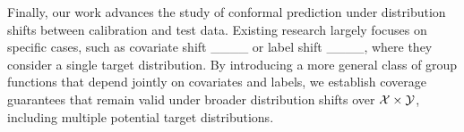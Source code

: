 Finally, our work advances the study of conformal prediction under distribution shifts between calibration and test data. Existing research largely focuses on specific cases, such as covariate shift ____ or label shift ____, where they consider a single target distribution. By introducing a more general class of group functions that depend jointly on covariates and labels, we establish coverage guarantees that remain valid under broader distribution shifts over $\cal X \times \cal Y$, including multiple potential target distributions.

